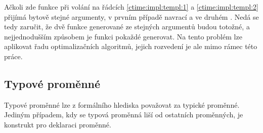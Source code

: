 Ačkoli zde funkce  při volání na řádcích \ref{ctime:impl:templ:1} a \ref{ctime:impl:templ:2} přijímá bytově stejné \ctime argumenty, v prvním případě navrací  a ve druhém . Nedá se tedy zaručit, že dvě funkce generované ze stejných \ctime argumentů budou totožné, a nejjednodušším způsobem je funkci pokaždé generovat. Na tento problém lze aplikovat řadu optimalizačních algoritmů, jejich rozvedení je ale mimo rámec této práce.

\subsection{Typové proměnné}
Typové proměnné lze z formálního hlediska považovat za typické \ctime proměnné. Jediným případem, kdy se typová proměnná liší od ostatních \ctime proměnných, je konstrukt pro deklaraci proměnné.

\begin{comment}
\subsection{Možné konflikty referencí, \ctime a CTFE}
Uvažme následující kód:

\begin{code}
Void foo( Int!? x, @ctime Int!? y ) {
	@ctime while( y < 2 ) {
		while( x < 10000 ) $\label{ctime:ctfeConflict:2}$
			x++;
		y++;
	}
}

Void main() {
	@ctime Int! a = 0;
	foo( a, a ); $\label{ctime:ctfeConflict:1}$
}
\end{code}

Funkce \inlineCode{foo} je zde na řádku \ref{ctime:ctfeConflict:1} volána za doby kompilace (protože se jí předává \ctime proměnná přes nekonstantní referenci). Uvážíme-li, že se funkce může vykonávat ve dvou stupních (v tomto případě to má smysl, protože řádek \ref{ctime:ctfeConflict:2} představuje relativně velký cyklus a interpret druhého stupně je rychlejší), vyvstává tu problém: kód po interpretaci prvního stupně bude vypadat takto:

\begin{code}
Void foo( Int!? x ) {
	@ctime while( y < 4 ) {
		while( x < 10000 )
			x++;
		// y = 1
		
		while( x < 10000 )
			x++;
		// y = 2
		
		while( x < 10000 )
			x++;
		// y = 3
	}
\end{code}

Chování funkce neodpovídá tomu, jak by se chovala při jednostupňové interpretaci. Jelikož v demonstračním kompilátoru dvoustupňová interpretace nebude, není třeba tento problém bezprostředně řešit. Řešení problému by ale mohlo vést k zavedení dalších limitujících pravidel, tedy k regresi.
\end{comment}


